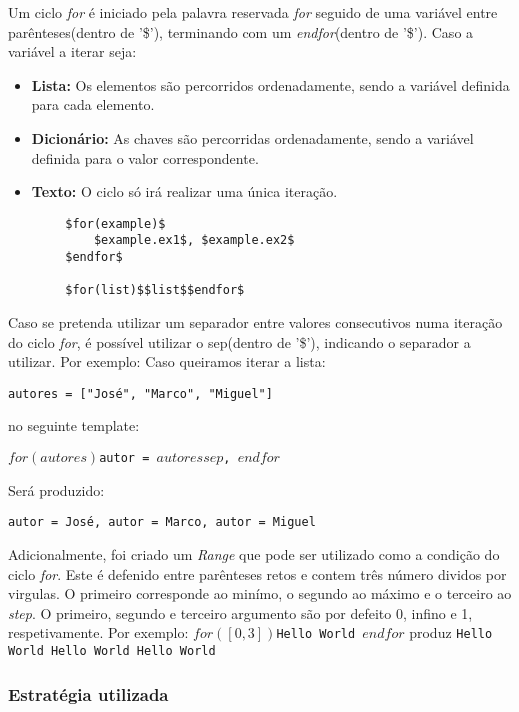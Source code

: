 \documentclass[../relatorio.tex]{subfiles}
\begin{document}
    Um ciclo \textit{for} é iniciado pela palavra reservada \textit{for}
    seguido de uma variável entre parênteses(dentro de '\$'), terminando 
    com um \textit{endfor}(dentro de '\$').
    Caso a variável a iterar seja:
    \begin{itemize}
        \item \textbf{Lista: }Os elementos são percorridos ordenadamente,
        sendo a variável definida para cada elemento.
        \item \textbf{Dicionário: }As chaves são percorridas ordenadamente,
        sendo a variável definida para o valor correspondente. 
        \item \textbf{Texto: }O ciclo só irá realizar uma única iteração.
    \end{itemize}

    \begin{verbatim}
        $for(example)$
            $example.ex1$, $example.ex2$
        $endfor$

        $for(list)$$list$$endfor$
    \end{verbatim}

    Caso se pretenda utilizar um separador entre valores consecutivos numa
    iteração do ciclo \textit{for}, é possível utilizar o sep(dentro de '\$'),
    indicando o separador a utilizar. Por exemplo:
    Caso queiramos iterar a lista:

    \texttt{autores = ["José", "Marco", "Miguel"]}

    no seguinte template:

    \texttt{$for(autores)$autor = $autores$$sep$, $endfor$}

    Será produzido:

    \texttt{autor = José, autor = Marco, autor = Miguel}

    Adicionalmente, foi criado um \textit{Range} que pode ser utilizado como a
    condição do ciclo \textit{for}. Este é defenido entre parênteses retos e 
    contem três número dividos por virgulas. O primeiro corresponde ao minímo, o segundo
    ao máximo e o terceiro ao \textit{step}. O primeiro, segundo e terceiro argumento são
    por defeito 0, infino e 1, respetivamente.
    Por exemplo:
    \texttt{$for([0, 3])$Hello World $endfor$}
    produz
    \texttt{Hello World Hello World Hello World }

    \subsubsection{Estratégia utilizada}
\end{document}
